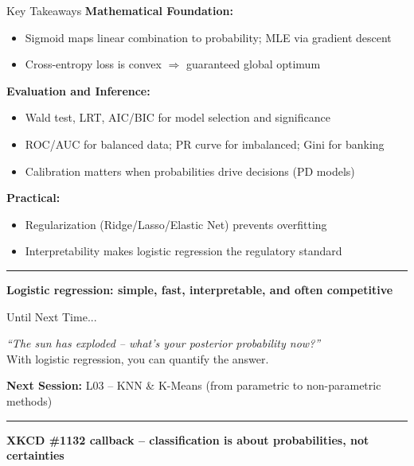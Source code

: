 \documentclass[8pt,aspectratio=169]{beamer}
\newcommand{\bottomnote}[1]{%
\vfill
\vspace{-2mm}
\textcolor{mllavender2}{\rule{\textwidth}{0.4pt}}
\vspace{1mm}
\footnotesize
\textbf{#1}
}
\begin{document}
\begin{frame}[t]{Key Takeaways}
\textbf{Mathematical Foundation:}
\begin{itemize}
\item Sigmoid maps linear combination to probability; MLE via gradient descent
\item Cross-entropy loss is convex $\Rightarrow$ guaranteed global optimum
\end{itemize}
\vspace{0.3em}
\textbf{Evaluation and Inference:}
\begin{itemize}
\item Wald test, LRT, AIC/BIC for model selection and significance
\item ROC/AUC for balanced data; PR curve for imbalanced; Gini for banking
\item Calibration matters when probabilities drive decisions (PD models)
\end{itemize}
\vspace{0.3em}
\textbf{Practical:}
\begin{itemize}
\item Regularization (Ridge/Lasso/Elastic Net) prevents overfitting
\item Interpretability makes logistic regression the regulatory standard
\end{itemize}
\bottomnote{Logistic regression: simple, fast, interpretable, and often competitive}
\end{frame}

\begin{frame}[t]{Until Next Time...}
\begin{center}
\textit{``The sun has exploded -- what's your posterior probability now?''}\\[0.5em]
With logistic regression, you can quantify the answer.
\end{center}
\vspace{1em}
\textbf{Next Session:} L03 -- KNN \& K-Means (from parametric to non-parametric methods)
\bottomnote{XKCD \#1132 callback -- classification is about probabilities, not certainties}
\end{frame}

\appendix
\end{document}
